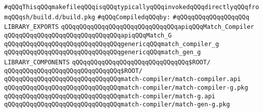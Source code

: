 \label{src/lib/compiler/back/low/tools/match-compiler.lib}
\verb|#qQQqThisqQQqmakefileqQQqisqQQqtypicallyqQQqinvokedqQQqdirectlyqQQqfromqQQqsh/build.d/build.pkg|\newline
\newline
\verb|#qQQqCompiledqQQqby:|\newline
\verb|#qQQqqQQqqQQqqQQqqQQq|\newline
\newline
\verb|LIBRARY_EXPORTS|\newline
\newline
\verb|qQQqqQQqqQQqqQQqqQQqqQQqqQQqqQQqapiqQQqMatch_Compiler|\newline
\verb|qQQqqQQqqQQqqQQqqQQqqQQqqQQqqQQqapiqQQqMatch_G|\newline
\newline
\verb|qQQqqQQqqQQqqQQqqQQqqQQqqQQqqQQqgenericqQQqmatch_compiler_g|\newline
\verb|qQQqqQQqqQQqqQQqqQQqqQQqqQQqqQQqgenericqQQqmatch_gen_g|\newline
\newline
\newline
\newline
\verb|LIBRARY_COMPONENTS|\newline
\newline
\verb|qQQqqQQqqQQqqQQqqQQqqQQqqQQqqQQq$ROOT/|\newline
\verb|qQQqqQQqqQQqqQQqqQQqqQQqqQQqqQQq$ROOT/|\newline
\newline
\verb|qQQqqQQqqQQqqQQqqQQqqQQqqQQqqQQqmatch-compiler/match-compiler.api|\newline
\verb|qQQqqQQqqQQqqQQqqQQqqQQqqQQqqQQqmatch-compiler/match-compiler-g.pkg|\newline
\verb|qQQqqQQqqQQqqQQqqQQqqQQqqQQqqQQqmatch-compiler/match-g.api|\newline
\verb|qQQqqQQqqQQqqQQqqQQqqQQqqQQqqQQqmatch-compiler/match-gen-g.pkg|\newline
\newline

